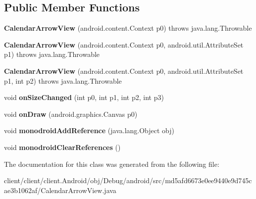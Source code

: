 \subsection*{Public Member Functions}
\begin{DoxyCompactItemize}
\item 
\hypertarget{classmd5afd6673e0ee9440e9d745cae3b1062af_1_1CalendarArrowView_a87c4040238d6c2aab32c2f66d7446eb6}{}{\bfseries Calendar\+Arrow\+View} (android.\+content.\+Context p0)  throws java.\+lang.\+Throwable 	\label{classmd5afd6673e0ee9440e9d745cae3b1062af_1_1CalendarArrowView_a87c4040238d6c2aab32c2f66d7446eb6}

\item 
\hypertarget{classmd5afd6673e0ee9440e9d745cae3b1062af_1_1CalendarArrowView_a284d649c69e56b41610e2b23b599edc3}{}{\bfseries Calendar\+Arrow\+View} (android.\+content.\+Context p0, android.\+util.\+Attribute\+Set p1)  throws java.\+lang.\+Throwable 	\label{classmd5afd6673e0ee9440e9d745cae3b1062af_1_1CalendarArrowView_a284d649c69e56b41610e2b23b599edc3}

\item 
\hypertarget{classmd5afd6673e0ee9440e9d745cae3b1062af_1_1CalendarArrowView_a620c125836fe5b1a28dec2adacd9c78e}{}{\bfseries Calendar\+Arrow\+View} (android.\+content.\+Context p0, android.\+util.\+Attribute\+Set p1, int p2)  throws java.\+lang.\+Throwable 	\label{classmd5afd6673e0ee9440e9d745cae3b1062af_1_1CalendarArrowView_a620c125836fe5b1a28dec2adacd9c78e}

\item 
\hypertarget{classmd5afd6673e0ee9440e9d745cae3b1062af_1_1CalendarArrowView_aaece2ac9ecfef42dc1de634c5501a913}{}void {\bfseries on\+Size\+Changed} (int p0, int p1, int p2, int p3)\label{classmd5afd6673e0ee9440e9d745cae3b1062af_1_1CalendarArrowView_aaece2ac9ecfef42dc1de634c5501a913}

\item 
\hypertarget{classmd5afd6673e0ee9440e9d745cae3b1062af_1_1CalendarArrowView_a38921341543c11c1ae4d1ea4e8254ff5}{}void {\bfseries on\+Draw} (android.\+graphics.\+Canvas p0)\label{classmd5afd6673e0ee9440e9d745cae3b1062af_1_1CalendarArrowView_a38921341543c11c1ae4d1ea4e8254ff5}

\item 
\hypertarget{classmd5afd6673e0ee9440e9d745cae3b1062af_1_1CalendarArrowView_ab6fd70c40ed9f0be434fc25cb79418a2}{}void {\bfseries monodroid\+Add\+Reference} (java.\+lang.\+Object obj)\label{classmd5afd6673e0ee9440e9d745cae3b1062af_1_1CalendarArrowView_ab6fd70c40ed9f0be434fc25cb79418a2}

\item 
\hypertarget{classmd5afd6673e0ee9440e9d745cae3b1062af_1_1CalendarArrowView_a41a817d05254935eaf82a9a4e6a1cb3a}{}void {\bfseries monodroid\+Clear\+References} ()\label{classmd5afd6673e0ee9440e9d745cae3b1062af_1_1CalendarArrowView_a41a817d05254935eaf82a9a4e6a1cb3a}

\end{DoxyCompactItemize}


The documentation for this class was generated from the following file\+:\begin{DoxyCompactItemize}
\item 
client/client/client.\+Android/obj/\+Debug/android/src/md5afd6673e0ee9440e9d745cae3b1062af/Calendar\+Arrow\+View.\+java\end{DoxyCompactItemize}
